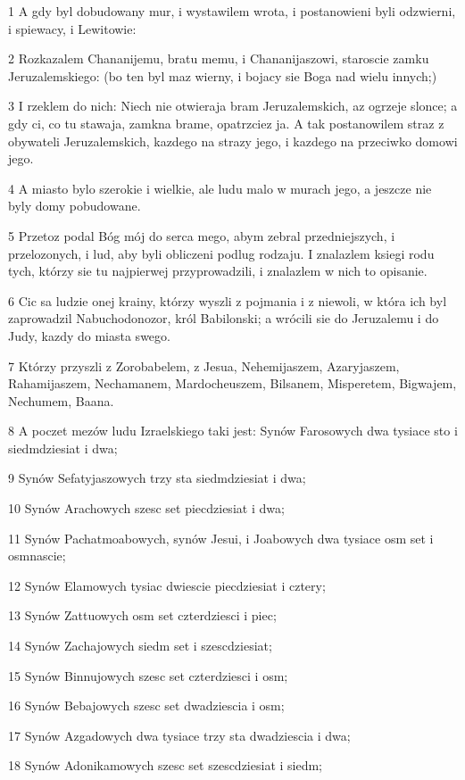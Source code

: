 \par 1 A gdy byl dobudowany mur, i wystawilem wrota, i postanowieni byli odzwierni, i spiewacy, i Lewitowie:
\par 2 Rozkazalem Chananijemu, bratu memu, i Chananijaszowi, staroscie zamku Jeruzalemskiego: (bo ten byl maz wierny, i bojacy sie Boga nad wielu innych;)
\par 3 I rzeklem do nich: Niech nie otwieraja bram Jeruzalemskich, az ogrzeje slonce; a gdy ci, co tu stawaja, zamkna brame, opatrzciez ja. A tak postanowilem straz z obywateli Jeruzalemskich, kazdego na strazy jego, i kazdego na przeciwko domowi jego.
\par 4 A miasto bylo szerokie i wielkie, ale ludu malo w murach jego, a jeszcze nie byly domy pobudowane.
\par 5 Przetoz podal Bóg mój do serca mego, abym zebral przedniejszych, i przelozonych, i lud, aby byli obliczeni podlug rodzaju. I znalazlem ksiegi rodu tych, którzy sie tu najpierwej przyprowadzili, i znalazlem w nich to opisanie.
\par 6 Cic sa ludzie onej krainy, którzy wyszli z pojmania i z niewoli, w która ich byl zaprowadzil Nabuchodonozor, król Babilonski; a wrócili sie do Jeruzalemu i do Judy, kazdy do miasta swego.
\par 7 Którzy przyszli z Zorobabelem, z Jesua, Nehemijaszem, Azaryjaszem, Rahamijaszem, Nechamanem, Mardocheuszem, Bilsanem, Misperetem, Bigwajem, Nechumem, Baana.
\par 8 A poczet mezów ludu Izraelskiego taki jest: Synów Farosowych dwa tysiace sto i siedmdziesiat i dwa;
\par 9 Synów Sefatyjaszowych trzy sta siedmdziesiat i dwa;
\par 10 Synów Arachowych szesc set piecdziesiat i dwa;
\par 11 Synów Pachatmoabowych, synów Jesui, i Joabowych dwa tysiace osm set i osmnascie;
\par 12 Synów Elamowych tysiac dwiescie piecdziesiat i cztery;
\par 13 Synów Zattuowych osm set czterdziesci i piec;
\par 14 Synów Zachajowych siedm set i szescdziesiat;
\par 15 Synów Binnujowych szesc set czterdziesci i osm;
\par 16 Synów Bebajowych szesc set dwadziescia i osm;
\par 17 Synów Azgadowych dwa tysiace trzy sta dwadziescia i dwa;
\par 18 Synów Adonikamowych szesc set szescdziesiat i siedm;
